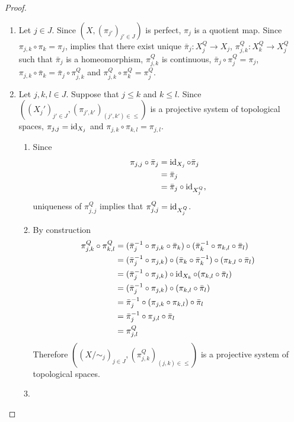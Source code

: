 \documentclass{book}
\begin{document}
\begin{proof}\
	\begin{enumerate}
		\item Let $j \in J$. Since $(X, (\pi_{j'})_{j' \in J})$ is perfect, $\pi_j$ is a quotient map. Since $\pi_{j,k} \circ \pi_k = \pi_j$,  implies that there exist unique $\bar{\pi}_j:X^Q_j \rightarrow X_j$, $\pi^Q_{j, k}: X^Q_k\rightarrow X^Q_j$ such that $\bar{\pi}_j$ is a homeomorphism, $\pi^Q_{j, k}$ is continuous, $\bar{\pi}_j \circ \pi^Q_j = \pi_j$, $\pi_{j,k} \circ \bar{\pi}_k = \bar{\pi}_j \circ \pi^Q_{j, k}$ and $\pi^Q_{j, k} \circ \pi^Q_k = \pi^Q_j$.
		\item Let $j,k,l \in J$. Suppose that $j \leq k$ and $k \leq l$. Since $((X_j')_{j' \in J}, (\pi_{j',k'})_{(j',k') \in \leq})$ is a projective system of topological spaces, $\pi_{j,j} = \operatorname{id}_{X_j}$ and $\pi_{j,k} \circ \pi_{k,l} = \pi_{j,l}$. 
		\begin{enumerate}
			\item Since 
			\begin{align*}
				\pi_{j,j} \circ \bar{\pi}_j
				& = \operatorname{id}_{X_j} \circ \bar{\pi}_j \\
				& = \bar{\pi}_j \\
				& = \bar{\pi}_j \circ \operatorname{id}_{X^Q_j},
			\end{align*}
			uniqueness of $\pi^Q_{j,j}$ implies that $\pi^Q_{j,j} = \operatorname{id}_{X^Q_j}$.
			\item By construction
			\begin{align*}
				\pi^Q_{j,k} \circ \pi^Q_{k,l}
				& = (\bar{\pi}_j^{-1} \circ \pi_{j,k} \circ \bar{\pi}_k) \circ (\bar{\pi}_k^{-1} \circ \pi_{k,l} \circ \bar{\pi}_l) \\
				& = (\bar{\pi}_j^{-1} \circ \pi_{j,k}) \circ (\bar{\pi}_k \circ \bar{\pi}_k^{-1}) \circ (\pi_{k,l} \circ \bar{\pi}_l) \\
				& = (\bar{\pi}_j^{-1} \circ \pi_{j,k}) \circ \operatorname{id}_{X_k} \circ (\pi_{k,l} \circ \bar{\pi}_l) \\ 
				& = (\bar{\pi}_j^{-1} \circ \pi_{j,k}) \circ (\pi_{k,l} \circ \bar{\pi}_l) \\
				& = \bar{\pi}_j^{-1} \circ (\pi_{j,k} \circ \pi_{k,l}) \circ \bar{\pi}_l \\
				& = \bar{\pi}_j^{-1} \circ \pi_{j,l} \circ \bar{\pi}_l \\
				& = \pi^Q_{j,l}
			\end{align*}
			Therefore $((X / {\sim_j})_{j \in J}, (\pi_{j,k}^Q)_{(j,k) \in \leq})$ is a projective system of topological spaces.
			\item \tcr{FINISH!!!}
		\end{enumerate}
	\end{enumerate}
\end{proof}
\end{document}
